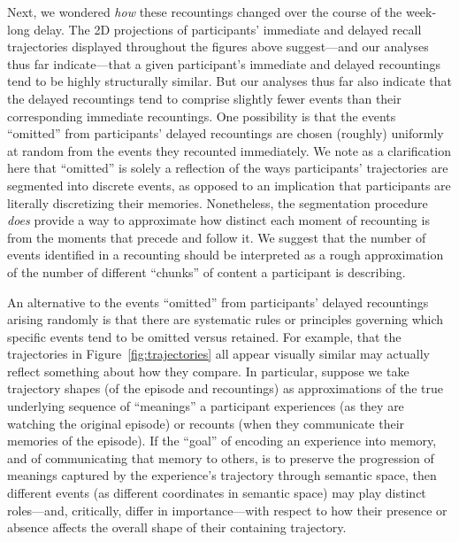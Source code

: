 \documentclass[10pt]{article}
\begin{document}
Next, we wondered \textit{how} these recountings changed over the course of the week-long delay.
The 2D projections of participants' immediate and delayed recall trajectories displayed throughout the figures above suggest---and our analyses thus far indicate---that a given participant's immediate and delayed recountings tend to be highly structurally similar.
But our analyses thus far also indicate that the delayed recountings tend to comprise slightly fewer events than their corresponding immediate recountings.
One possibility is that the events ``omitted'' from participants' delayed recountings are chosen (roughly) uniformly at random from the events they recounted immediately.
We note as a clarification here that ``omitted'' is solely a reflection of the ways participants' trajectories are segmented into discrete events, as opposed to an implication that participants are literally discretizing their memories.
Nonetheless, the segmentation procedure \textit{does} provide a way to approximate how distinct each moment of recounting is from the moments that precede and follow it.
We suggest that the number of events identified in a recounting should be interpreted as a rough approximation of the number of different ``chunks'' of content a participant is describing.

An alternative to the events ``omitted'' from participants' delayed recountings arising randomly is that there are systematic rules or principles governing which specific events tend to be omitted versus retained.
For example, that the trajectories in Figure~\ref{fig:trajectories} all appear visually similar may actually reflect something about how they compare.
In particular, suppose we take trajectory shapes (of the episode and recountings) as approximations of the true underlying sequence of ``meanings'' a participant experiences (as they are watching the original episode) or recounts (when they communicate their memories of the episode).
If the ``goal'' of encoding an experience into memory, and of communicating that memory to others, is to preserve the progression of meanings captured by the experience's trajectory through semantic space, then different events (as different coordinates in semantic space) may play distinct roles---and, critically, differ in importance---with respect to how their presence or absence affects the overall shape of their containing trajectory.
\end{document}

